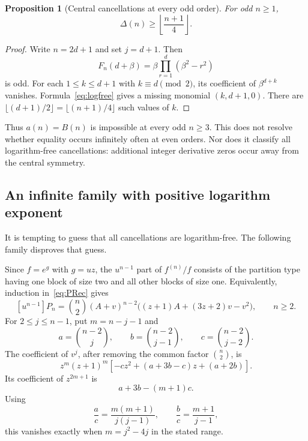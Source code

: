 \documentclass[11pt]{article}
\numberwithin{equation}{section}
\newtheorem{proposition}[theorem]{Proposition}
\theoremstyle{definition}
\theoremstyle{remark}
\begin{document}
\begin{proposition}[Central cancellations at every odd order]\label{prop:odd}
For odd $n\ge1$,
\begin{equation}\label{eq:odddeficit}
 \Delta(n)\ge\left\lfloor\frac{n+1}{4}\right\rfloor.
\end{equation}
\end{proposition}
\begin{proof}
Write $n=2d+1$ and set $j=d+1$. Then
\[
 F_n(d+\beta)=\beta\prod_{r=1}^d(\beta^2-r^2)
\]
is odd. For each $1\le k\le d+1$ with $k\equiv d\pmod2$, its coefficient of
$\beta^{d+k}$ vanishes. Formula~\eqref{eq:logfree} gives a missing monomial
$(k,d+1,0)$. There are $\lfloor(d+1)/2\rfloor=\lfloor(n+1)/4\rfloor$ such
values of $k$.
\end{proof}

Thus $a(n)=B(n)$ is impossible at every odd $n\ge3$. This does not resolve
whether equality occurs infinitely often at even orders. Nor does it
classify all logarithm-free cancellations: additional integer derivative
zeros occur away from the central symmetry.

\subsection{An infinite family with positive logarithm exponent}

It is tempting to guess that all cancellations are logarithm-free.
The following family disproves that guess.

Since $f=e^g$ with $g=uz$, the $u^{n-1}$ part of $f^{(n)}/f$ consists of the
partition type having one block of size two and all other blocks of size one.
Equivalently, induction in~\eqref{eq:PRec} gives
\begin{equation}\label{eq:almosttop}
 [u^{n-1}]P_n=\binom n2(A+v)^{n-2}
 \bigl((z+1)A+(3z+2)v-v^2\bigr),\qquad n\ge2.
\end{equation}
For $2\le j\le n-1$, put $m=n-j-1$ and
\[
 a=\binom{n-2}{j},\qquad b=\binom{n-2}{j-1},\qquad
 c=\binom{n-2}{j-2}.
\]
The coefficient of $v^j$, after removing the common factor $\binom n2$, is
\begin{equation}\label{eq:quadraticrow}
 z^m(z+1)^m\left[-cz^2+(a+3b-c)z+(a+2b)\right].
\end{equation}
Its coefficient of $z^{2m+1}$ is
\begin{equation}\label{eq:nexttotop}
 a+3b-(m+1)c.
\end{equation}
Using
\[
 \frac ac=\frac{m(m+1)}{j(j-1)},\qquad
 \frac bc=\frac{m+1}{j-1},
\]
this vanishes exactly when $m=j^2-4j$ in the stated range.
\end{document}
